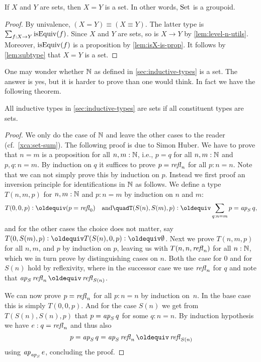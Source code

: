 \begin{lemma}\label{lem:eq_of_sets-is-set}
If $X$ and $Y$ are sets, then $X=Y$ is a set. 
In other words, $\mathord{\mathrm{Set}}$ is a groupoid.
\end{lemma}

\begin{proof}
By univalence, $(X=Y) \equiv (X\equiv Y)$. The latter type is
$\sum_{f:X\to Y} \mathrm{isEquiv}(f)$. Since $X$ and $Y$ are sets,
so is $X\to Y$ by \cref{lem:level-n-utils}. Moreover,
$\mathrm{isEquiv}(f)$ is a proposition by \cref{lem:isX-is-prop}.
It follows by \cref{lem:subtype} that $X=Y$ is a set.  
\end{proof}

One may wonder whether $\mathbb{N}$ as defined in \cref{sec:inductive-types}
is a set. The answer is yes, but it is harder to prove than one
would think. In fact we have the following theorem.

\begin{theorem}\label{thm:isset-inductive-types}
All inductive types in \cref{sec:inductive-types} are sets
if all constituent types are sets.
\end{theorem}

\begin{proof}
  We only do the case of $\mathbb{N}$ and leave the other cases to the reader
  (cf.\ \cref{xca:set-sum}). The following proof is due to Simon Huber.
  We have to prove that $n=m$ is a
  proposition for all $n,m:\mathbb{N}$, i.e., $p = q$ for all $n,m : \mathbb{N}$ and
  $p, q : n = m$.  By induction on $q$ it suffices to prove $p = \mathop{{\it refl}_{n}}$ for all $p : n = n$.  Note that we can not simply prove this by
  induction on $p$.  Instead we first proof an inversion principle for
  identifications in $\mathbb{N}$ as follows.  We define a type $T(n,m,p)$
  for $n, m : \mathbb{N}$ and $p : n = m$ by induction on $n$ and $m$:
  \[
    T(0,0,p) \defeq (p = \refl{0})%
    \quad \text{and} \quad%
    T(S(n), S(m), p) \defeq \sum_{q : n = m} p = \ap S q,%
  \]
  and for the other cases the choice does not matter, say $T(0, S(m),
  p) \defeq T(S(n), 0 ,p) \defeq \emptytype$.  Next we prove $T(n,m,p)$
  for all $n,m$, and $p$ by induction on $p$, leaving us with
  $T(n,n,\mathop{{\it refl}_{n}})$ for all $n : \mathbb{N}$, which we in turn prove by
  distinguishing cases on $n$.  Both the case for $0$ and for $S(n)$
  hold by reflexivity, where in the successor case we use $\mathop{{\it refl}_{n}}$
  for $q$ and note that $\ap S \refl{n} \jdeq \refl{S(n)}$.

  We can now prove $p = \mathop{{\it refl}_{n}}$ for all $p : n = n$ by induction
  on~$n$.  In the base case this is simply $T(0,0,p)$.  And for the
  case $S(n)$ we get from $T(S(n),S(n),p)$ that $p = \mathop{{\it ap}_{S}} q$ for
  some $q : n = n$.  By induction hypothesis we have $e : q =
  \mathop{{\it refl}_{n}}$ and thus also
  \[
    p = \ap{S} q = \ap{S} \refl{n} \jdeq \refl{S (n)}
  \]
  using $\mathop{{\it ap}_{\mathop{{\it ap}_{S}}}} e$, concluding the proof.
\end{proof}

